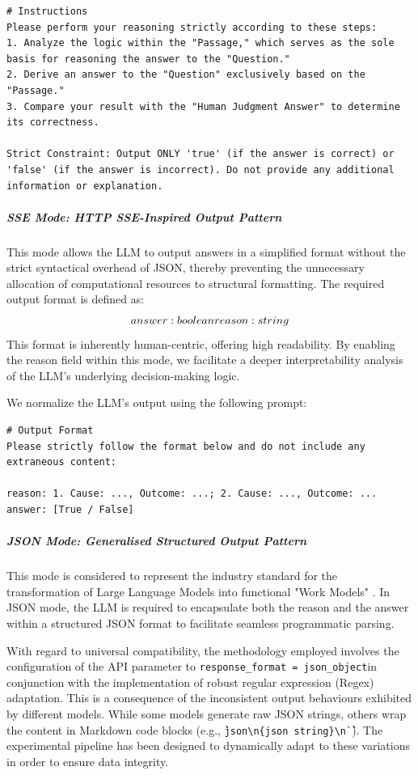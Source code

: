 \begin{placeholderblock}
\end{placeholderblock}
\begin{verbatim}
# Instructions
Please perform your reasoning strictly according to these steps:
1. Analyze the logic within the "Passage," which serves as the sole basis for reasoning the answer to the "Question."
2. Derive an answer to the "Question" exclusively based on the "Passage."
3. Compare your result with the "Human Judgment Answer" to determine its correctness.

Strict Constraint: Output ONLY 'true' (if the answer is correct) or 'false' (if the answer is incorrect). Do not provide any additional information or explanation.
\end{verbatim}

\subparagraph{SSE Mode: HTTP SSE-Inspired Output Pattern}
This mode allows the LLM to output answers in a simplified format without the strict syntactical overhead of JSON, thereby preventing the unnecessary allocation of computational resources to structural formatting. The required output format is defined as:
$$
answer: boolean\\
reason: string
$$
This format is inherently human-centric, offering high readability. By enabling the reason field within this mode, we facilitate a deeper interpretability analysis of the LLM's underlying decision-making logic.

We normalize the LLM's output using the following prompt:
\begin{verbatim}
# Output Format
Please strictly follow the format below and do not include any extraneous content:

reason: 1. Cause: ..., Outcome: ...; 2. Cause: ..., Outcome: ...
answer: [True / False]
\end{verbatim}

\subparagraph{JSON Mode: Generalised Structured Output Pattern}
This mode is considered to represent the industry standard for the transformation of Large Language Models into functional "Work Models" \ph{[ref]}. In JSON mode, the LLM is required to encapsulate both the reason and the answer within a structured JSON format to facilitate seamless programmatic parsing.

With regard to universal compatibility, the methodology employed involves the configuration of the API parameter to \texttt{response\_format = json\_object}in conjunction with the implementation of robust regular expression (Regex) adaptation. This is a consequence of the inconsistent output behaviours exhibited by different models. While some models generate raw JSON strings, others wrap the content in Markdown code blocks (e.g., \texttt{\`\`\`json\textbackslash n\{json string\}\textbackslash n\`\`\`}). The experimental pipeline has been designed to dynamically adapt to these variations in order to ensure data integrity.

